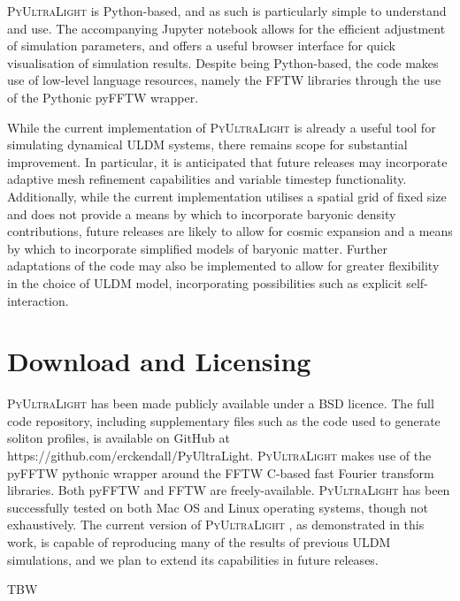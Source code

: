 \documentclass[a4paper,11pt]{article}
\newcommand{\PyUltraLight}{\textsc{PyUltraLight }}
\begin{document}
\PyUltraLight is Python-based, and as such is particularly simple to understand and use. The accompanying Jupyter notebook allows for the efficient adjustment of simulation parameters, and offers a useful browser interface for quick visualisation of simulation results. Despite being Python-based, the code makes use of low-level language resources, namely the FFTW libraries through the use of the Pythonic pyFFTW wrapper. 

While the current implementation of \PyUltraLight is already a useful tool for simulating dynamical ULDM systems, there remains scope for substantial improvement. In particular, it is anticipated that future releases may incorporate adaptive mesh refinement capabilities and variable timestep functionality. Additionally, while the current implementation utilises a spatial grid of fixed size and does not provide a means by which to incorporate baryonic density contributions, future releases are likely to allow for cosmic expansion and a means by which to incorporate simplified models of baryonic matter. Further adaptations of the code may also be implemented to allow for greater flexibility in the choice of ULDM model, incorporating possibilities such as explicit self-interaction. 





\appendix
\section{Download and Licensing}

\PyUltraLight has been made publicly available under a BSD licence. The full code repository, including supplementary files such as the code used to generate soliton profiles, is available on GitHub at https://github.com/erckendall/PyUltraLight. \PyUltraLight makes use of the pyFFTW pythonic wrapper around the FFTW C-based fast Fourier transform libraries. Both pyFFTW and FFTW are freely-available. \PyUltraLight has been successfully tested on both Mac OS and Linux operating systems, though not exhaustively. The current version of \PyUltraLight, as demonstrated in this work, is capable of reproducing many of the results of previous ULDM simulations, and we plan to extend its capabilities in future releases.  

\acknowledgments

TBW



\end{document}
